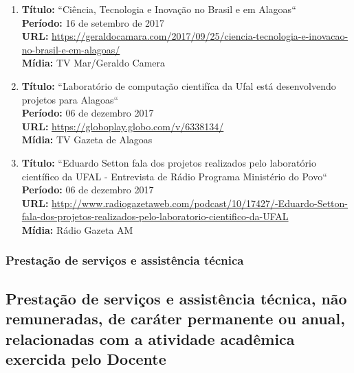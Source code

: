 \documentclass[a4paper,oneside,10pt]{article}
\begin{document}
\begin{enumerate}
 \item    \textbf{Título:} ``Ciência, Tecnologia e Inovação no Brasil e em Alagoas`` 
  \mbox{} \\
        \textbf{Período:} 16 de setembro de 2017\\
        \textbf{URL:} \url{https://geraldocamara.com/2017/09/25/ciencia-tecnologia-e-inovacao-no-brasil-e-em-alagoas/}\\
        \textbf{Mídia:}  TV Mar/Geraldo Camera\\      
 
  \item   \textbf{Título:} ``Laboratório de computação cientifíca da Ufal está desenvolvendo projetos para Alagoas``
  \mbox{} \\    
        \textbf{Período:} 06 de dezembro 2017 \\
        \textbf{URL:} \url{https://globoplay.globo.com/v/6338134/}\\
        \textbf{Mídia:} TV Gazeta de Alagoas\\   
         
 \item  \textbf{Título:} ``Eduardo Setton fala dos projetos realizados pelo laboratório científico da UFAL - Entrevista de Rádio Programa Ministério do Povo`` \mbox{} \\
        \textbf{Período:} 06 de dezembro 2017 \\
        \textbf{URL:} \url{http://www.radiogazetaweb.com/podcast/10/17427/-Eduardo-Setton-fala-dos-projetos-realizados-pelo-laboratorio-cientifico-da-UFAL}\\
        \textbf{Mídia:} Rádio Gazeta AM\\

  \end{enumerate}      


\subsubsection{Prestação de serviços e assistência técnica}
\vspace{0.3cm}

\subsection{Prestação de serviços e assistência técnica, não remuneradas, de caráter permanente ou anual, relacionadas com a atividade acadêmica exercida pelo Docente}
\vspace{0.3cm}
\end{document}
